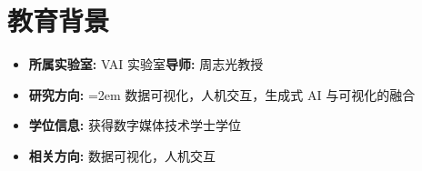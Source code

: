 \documentclass[AutoFakeBold]{resume}
\begin{document}
\section{\makebox[.75em][c]{\faGraduationCap} \textbf{\fangsong 教育背景}}
\begin{itemize}
    \item \textbf{\kaishu 所属实验室: }\kaishu VAI 实验室\qquad \textbf{\kaishu 导师: }\kaishu 周志光教授
    \item \textbf{\kaishu 研究方向: }\hangindent=2em 
    \kaishu 数据可视化，人机交互，生成式 AI 与可视化的融合
\end{itemize}
\begin{itemize}
    \item \textbf{\kaishu 学位信息: }\kaishu 获得数字媒体技术学士学位
    \item \textbf{\kaishu 相关方向: }\kaishu 数据可视化，人机交互
\end{itemize}
\end{document}
